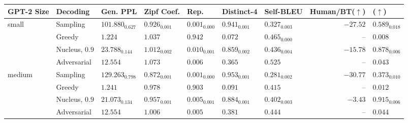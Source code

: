 \documentclass{article}
\theoremstyle{definition}
\newcommand{\name}{{\fontfamily{bch}\selectfont{\textsc{Mauve}}}\xspace}
\newcommand{\tabemph}[1]{\cellcolor{lightmauve!30}\textcolor{black!50!royalazure}{#1}}%
\begin{document}
%
\begin{table}[t!]
\centering
\begin{adjustbox}{max width=\textwidth}
\begin{tabular}{lllllllrl}
\toprule
\bf GPT-2  Size    &   \bf    Decoding             &      \bf              Gen. PPL &           \bf     Zipf Coef. &               \bf        Rep. &       \bf         Distinct-4 &           \bf      Self-BLEU & \bf Human/BT($\uparrow$) & \bf \name($\uparrow$) \\
\midrule
\multirow{4}{*}{small} & Sampling &          $101.880_{0.627}$ &           $0.926_{0.001}$ &           $0.001_{0.000}$ &           $0.941_{0.001}$ &           $0.327_{0.003}$ &                      $-27.52$ &            $0.589_{0.018}$ \\
      & Greedy &                    $1.224$ &                   $1.037$ &                   $0.942$ &                   $0.072$ &           $0.465_{0.000}$ &                 --            &                    $0.008$ \\
      & Nucleus, $0.9$ &           $23.788_{0.144}$ &           $1.012_{0.002}$ &           $0.010_{0.001}$ &           $0.859_{0.002}$ &           $0.436_{0.004}$ &              $-15.78$ &            $0.878_{0.006}$ \\
      & Adversarial &            \tabemph{$\mathbf{12.554}$} &           $1.073$ &           $0.006$ &           $0.365$ &           $0.525$ &             -- &            $0.043$ \\
\midrule
\multirow{4}{*}{medium} & Sampling &          $129.263_{0.798}$ &           $0.872_{0.001}$ &           $0.001_{0.000}$ &           $0.953_{0.001}$ &           $0.281_{0.002}$ &              $-30.77$ &            $0.373_{0.010}$ \\
      & Greedy &                    $1.241$ &                   $0.978$ &                   $0.903$ &                   $0.091$ &                   $0.415$ &                 --        &                    $0.012$ \\
      & Nucleus, $0.9$ &           $21.073_{0.134}$ &           \tabemph{$\mathbf{0.957}_{0.001}$} &           $0.005_{0.001}$ &  \tabemph{$\mathbf{0.884}_{0.001}$} &  \tabemph{$\mathbf{0.402}_{0.003}$} &                  $-3.43$ &            $0.915_{0.006}$ \\
      & Adversarial &           \tabemph{$\mathbf{12.554}$} &           $1.006$ &           $0.005$ &           $0.381$ &           $0.444$ &            -- &            $0.044$ \\

\end{tabular}
\end{adjustbox}
\end{table}
\end{document}
